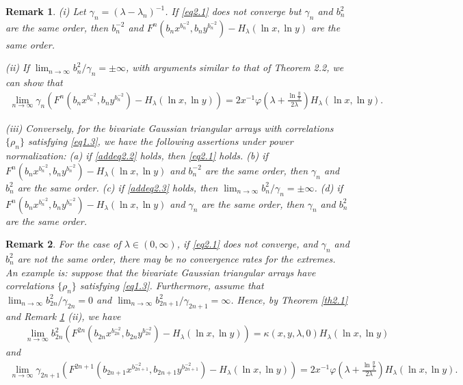 \documentclass[10pt,twosided]{article}
\newtheorem{remark}{Remark}[section]
\numberwithin{equation}{section}
\numberwithin{equation}{section}
\begin{document}
\begin{remark}\label{rem2.2}
(i) Let $\gamma_n=(\lambda-\lambda_n)^{-1}$. If \eqref{eq2.1} does not converge but
$\gamma_n$ and $b_n^2$ are the same order,
then $b_{n}^{-2}$
and $ F^n\left( b_nx^{b_n^{-2}},b_ny^{b_n^{-2}} \right) -H_{\lambda}(\ln x,\ln y)$ are the same order.

(ii) If $\lim_{n\to \infty} b_n^2/\gamma_n=\pm\infty$, with arguments similar to
that of Theorem 2.2, we can show that
\begin{eqnarray}\label{addeq2.3}
\lim_{n\to \infty} \gamma_n \left( F^n\left( b_nx^{b_n^{-2}},b_ny^{b_n^{-2}} \right) -H_{\lambda}(\ln x,\ln y)\right)
= 2x^{-1}\varphi\left( \lambda+ \frac{\ln\frac{y}{x}}{2\lambda} \right)H_{\lambda}(\ln x,\ln y).
\end{eqnarray}

(iii) Conversely, for the bivariate Gaussian triangular arrays with correlations $\{\rho_n\}$ satisfying \eqref{eq1.3}, we have the following assertions under power normalization:
(a) if \eqref{addeq2.2} holds, then \eqref{eq2.1} holds.
(b) if $ F^n\left( b_nx^{b_n^{-2}},b_ny^{b_n^{-2}} \right) -H_{\lambda}(\ln x,\ln y)$ and $b_n^{-2}$ are the same order,
then $\gamma_n$ and $b_{n}^2$ are the same order.
(c) if \eqref{addeq2.3} holds, then $\lim_{n\to \infty} b_n^2/\gamma_n=\pm \infty$.
(d) if $ F^n\left( b_nx^{b_n^{-2}},b_ny^{b_n^{-2}} \right) -H_{\lambda}(\ln x,\ln y)$ and $\gamma_n$ are the same order, then $\gamma_n$ and $b_n^2$ are the same order.
\end{remark}

\begin{remark}\label{rem2.3}
For the case of $\lambda \in (0,\infty)$, if \eqref{eq2.1} does not converge, and $\gamma_n$ and $b_n^2$ are not
the same order, there may be no convergence rates for the extremes. An example is: suppose that the bivariate
Gaussian triangular arrays have correlations $\{\rho_n \}$ satisfying \eqref{eq1.3}. Furthermore, assume that
$\lim_{n\to \infty} b_{2n}^2/\gamma_{2n}=0$ and
$\lim_{n\to \infty} b_{2n+1}^2/\gamma_{2n+1}=\infty$. Hence, by Theorem \ref{th2.1} and Remark \ref{rem2.2} (ii),
we have
\begin{eqnarray*}
&&\lim_{n\to \infty} b_{2n}^2\left( F^{2n}\left( b_{2n}x^{b_{2n}^{-2}},b_{2n}y^{b_{2n}^{-2}} \right) -H_{\lambda}(\ln x,\ln y)\right)
=\kappa(x,y,\lambda,0)H_{\lambda}(\ln x,\ln y)
\end{eqnarray*}
and
\begin{eqnarray*}
\lim_{n\to \infty} \gamma_{2n+1}\left( F^{2n+1}\left( b_{2n+1}x^{b_{2n+1}^{-2}},b_{2n+1}y^{b_{2n+1}^{-2}} \right) -H_{\lambda}(\ln x,\ln y)\right)
= 2x^{-1} \varphi\left( \lambda+\frac{\ln \frac{y}{x}}{2\lambda} \right) H_{\lambda}(\ln x,\ln y).
\end{eqnarray*}
\end{remark}
\end{document}
